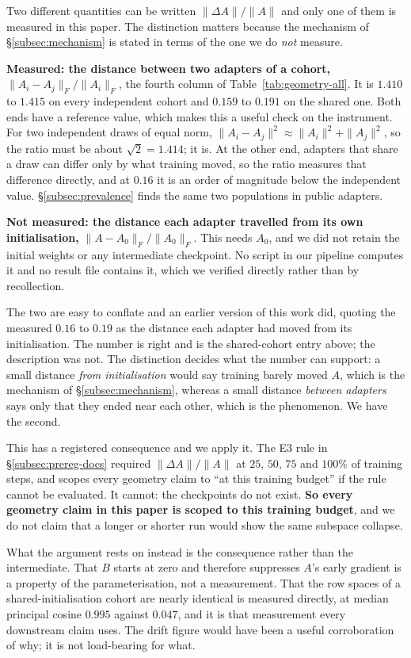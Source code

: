 Two different quantities can be written $\|\Delta A\|/\|A\|$ and only one of
them is measured in this paper. The distinction matters because the
mechanism of \S\ref{subsec:mechanism} is stated in terms of the one we do
\emph{not} measure.

\textbf{Measured: the distance between two adapters of a cohort,}
$\|A_i - A_j\|_F/\|A_i\|_F$, the fourth column of
Table~\ref{tab:geometry-all}. It is $1.410$ to $1.415$ on every independent
cohort and $0.159$ to $0.191$ on the shared one. Both ends have a reference
value, which makes this a useful check on the instrument. For two
independent draws of equal norm, $\|A_i - A_j\|^2 \approx \|A_i\|^2 +
\|A_j\|^2$, so the ratio must be about $\sqrt 2 = 1.414$; it is. At the
other end, adapters that share a draw can differ only by what training
moved, so the ratio measures that difference directly, and at $0.16$ it is
an order of magnitude below the independent value.
\S\ref{subsec:prevalence} finds the same two populations in public adapters.

\textbf{Not measured: the distance each adapter travelled from its own
initialisation,} $\|A - A_0\|_F/\|A_0\|_F$. This needs $A_0$, and we did not
retain the initial weights or any intermediate checkpoint. No script in our
pipeline computes it and no result file contains it, which we verified
directly rather than by recollection.

The two are easy to conflate and an earlier version of this work did,
quoting the measured $0.16$ to $0.19$ as the distance each adapter had moved
from its initialisation. The number is right and is the shared-cohort entry
above; the description was not. The distinction decides what the number can
support: a small distance \emph{from initialisation} would say training barely
moved $A$, which is the mechanism of \S\ref{subsec:mechanism}, whereas a small
distance \emph{between adapters} says only that they ended near each other,
which is the phenomenon. We have the second.

This has a registered consequence and we apply it. The E3 rule in
\S\ref{subsec:prereg-docs} required $\|\Delta A\|/\|A\|$ at $25$, $50$, $75$
and $100\%$ of training steps, and scopes every geometry claim to ``at this
training budget'' if the rule cannot be evaluated. It cannot: the
checkpoints do not exist. \textbf{So every geometry claim in this paper is
scoped to this training budget}, and we do not claim that a longer or
shorter run would show the same subspace collapse.

What the argument rests on instead is the consequence rather than the
intermediate. That $B$ starts at zero and therefore suppresses $A$'s early
gradient is a property of the parameterisation, not a measurement. That the
row spaces of a shared-initialisation cohort are nearly identical is
measured directly, at median principal cosine $0.995$ against $0.047$, and
it is that measurement every downstream claim uses. The drift figure would
have been a useful corroboration of why; it is not load-bearing for what.

